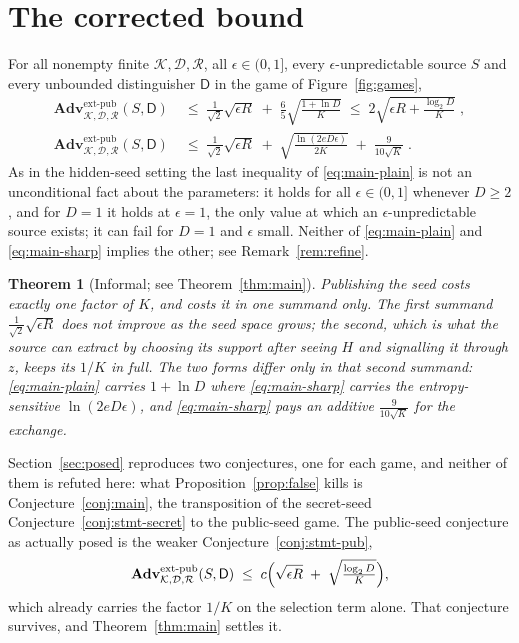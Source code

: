 \documentclass{aicr-solution}
\newcommand{\Adv}{\mathbf{Adv}}
\newcommand{\extp}{\mathrm{ext}\text{-}\mathrm{pub}}
\newcommand{\calK}{\mathcal{K}}
\newcommand{\calD}{\mathcal{D}}
\newcommand{\calR}{\mathcal{R}}
\newtheorem*{theoremstar}{Theorem}
\begin{document}
\section{The corrected bound}\label{sec:corrected}

\begin{theorem}\label{thm:main}
For all nonempty finite $\calK, \calD, \calR$, all $\epsilon \in (0,1]$, every $\epsilon$-unpredictable
source $S$ and every unbounded distinguisher $\mathsf{D}$ in the game of Figure~\ref{fig:games},
\begin{align}
  \Adv^{\extp}_{\calK,\calD,\calR}(S,\mathsf{D})
  &\;\le\; \frac{1}{\sqrt{2}}\sqrt{\epsilon R}
        \;+\; \frac{6}{5}\sqrt{\frac{1 + \ln D}{K}}
  \;\le\; 2\sqrt{\epsilon R + \frac{\log_2 D}{K}} \; ,
  \label{eq:main-plain}\\[2pt]
  \Adv^{\extp}_{\calK,\calD,\calR}(S,\mathsf{D})
  &\;\le\; \frac{1}{\sqrt{2}}\sqrt{\epsilon R}
        \;+\; \sqrt{\frac{\ln(2eD\epsilon)}{2K}} \;+\; \frac{9}{10\sqrt{K}} \; .
  \label{eq:main-sharp}
\end{align}
As in the hidden-seed setting the last inequality of \eqref{eq:main-plain} is not an unconditional
fact about the parameters: it holds for all $\epsilon \in (0,1]$ whenever $D \ge 2$, and for
$D = 1$ it holds at $\epsilon = 1$, the only value at which an $\epsilon$-unpredictable source
exists; it can fail for $D = 1$ and $\epsilon$ small. Neither of
\eqref{eq:main-plain} and \eqref{eq:main-sharp} implies the other; see Remark~\ref{rem:refine}.
\end{theorem}

\begin{theoremstar}[Informal; see Theorem~\ref{thm:main}]
Publishing the seed costs exactly one factor of $K$, and costs it in one summand only. The first
summand $\tfrac{1}{\sqrt{2}}\sqrt{\epsilon R}$ does not improve as the seed space grows; the
second, which is what the source can extract by choosing its support after seeing $H$ and signalling
it through $z$, keeps its $1/K$ in full. The two forms differ only in that second summand:
\eqref{eq:main-plain} carries $1 + \ln D$ where \eqref{eq:main-sharp} carries the
entropy-sensitive $\ln(2eD\epsilon)$, and \eqref{eq:main-sharp} pays an additive
$\tfrac{9}{10\sqrt{K}}$ for the exchange.
\end{theoremstar}

Section~\ref{sec:posed} reproduces two conjectures, one for each game, and neither of them is
refuted here: what Proposition~\ref{prop:false} kills is Conjecture~\ref{conj:main}, the
transposition of the secret-seed Conjecture~\ref{conj:stmt-secret} to the public-seed game. The
public-seed conjecture as actually posed is the weaker Conjecture~\ref{conj:stmt-pub},
\begin{equation}\label{eq:pubconj}
  \Adv^{\extp}_{\calK,\calD,\calR}(S,\mathsf{D})
  \;\le\; c\Bigl(\sqrt{\epsilon R} \;+\; \sqrt{\tfrac{\log_2 D}{K}}\Bigr) ,
\end{equation}
which already carries the factor $1/K$ on the selection term alone. That conjecture survives, and
Theorem~\ref{thm:main} settles it.
\end{document}
